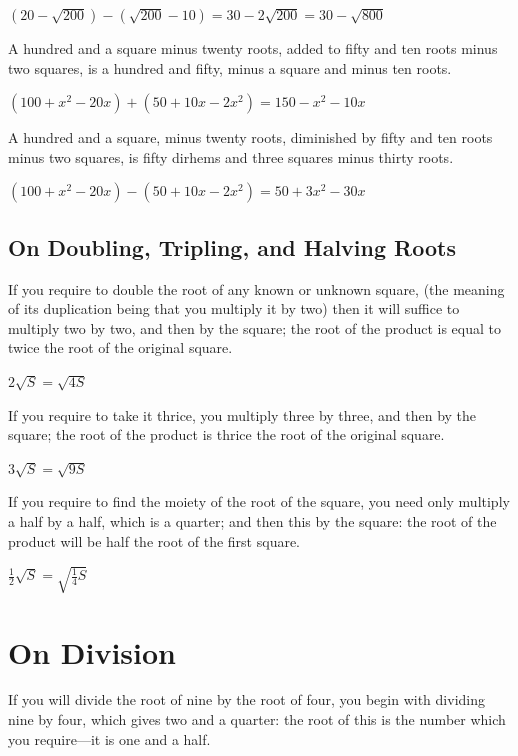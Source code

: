 \documentclass[11pt,a4paper,openany,oneside]{book}
\begin{document}
$(20 - \sqrt{200}) - (\sqrt{200} - 10) = 30 - 2\sqrt{200} = 30 - \sqrt{800}$

A hundred and a square minus twenty roots, added to fifty and ten roots minus
two squares, is a hundred and fifty, minus a square and minus ten roots.

$(100 + x^2 - 20x) + (50 + 10x - 2x^2) = 150 - x^2 - 10x$

A hundred and a square, minus twenty roots, diminished by fifty and ten roots
minus two squares, is fifty dirhems and three squares minus thirty roots.

$(100 + x^2 - 20x) - (50 + 10x - 2x^2) = 50 + 3x^2 - 30x$

\section{On Doubling, Tripling, and Halving Roots}

If you require to double the root of any known or unknown square, (the
meaning of its duplication being that you multiply it by two) then it will
suffice to multiply two by two, and then by the square; the root of the
product is equal to twice the root of the original square.

$2\sqrt{S} = \sqrt{4S}$

If you require to take it thrice, you multiply three by three, and then by
the square; the root of the product is thrice the root of the original
square.

$3\sqrt{S} = \sqrt{9S}$

If you require to find the moiety of the root of the square, you need only
multiply a half by a half, which is a quarter; and then this by the square:
the root of the product will be half the root of the first square.

$\tfrac{1}{2}\sqrt{S} = \sqrt{\tfrac{1}{4}S}$

\newpage

\chapter{On Division}
\label{ch:division}

If you will divide the root of nine by the root of four, you begin with
dividing nine by four, which gives two and a quarter: the root of this is the
number which you require---it is one and a half.
\end{document}
